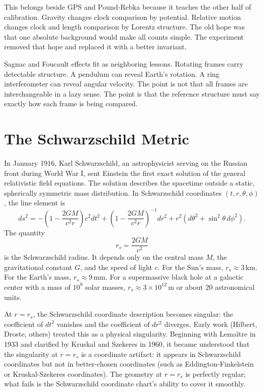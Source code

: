 This belongs beside GPS and Pound-Rebka because it teaches the other half of
calibration. Gravity changes clock comparison by potential. Relative motion
changes clock and length comparison by Lorentz structure. The old hope was that
one absolute background would make all counts simple. The experiment removed
that hope and replaced it with a better invariant.

Sagnac and Foucault effects fit as neighboring lessons. Rotating frames carry
detectable structure. A pendulum can reveal Earth's rotation. A ring
interferometer can reveal angular velocity. The point is not that all frames
are interchangeable in a lazy sense. The point is that the reference structure
must say exactly how each frame is being compared.

\section{The Schwarzschild Metric}
\label{se:the-schwarzschild-metric}

In January 1916, Karl Schwarzschild, an astrophysicist serving on the Russian
front during World War I, sent Einstein the first exact solution of the
general relativistic field equations. The solution describes the spacetime
outside a static, spherically symmetric mass distribution. In Schwarzschild
coordinates $(t, r, \theta, \phi)$, the line element is
\[
ds^2 = -\left(1 - \frac{2GM}{c^2 r}\right) c^2 dt^2 + \left(1 - \frac{2GM}{c^2 r}\right)^{-1} dr^2 + r^2(d\theta^2 + \sin^2\theta \, d\phi^2).
\]
The quantity
\[
r_s = \frac{2GM}{c^2}
\label{eq:chapter8-schwarzschild-radius}
\]
is the Schwarzschild radius. It depends only on the central mass $M$, the
gravitational constant $G$, and the speed of light $c$. For the Sun's mass,
$r_s \approx 3\,\mathrm{km}$. For the Earth's mass, $r_s \approx
9\,\mathrm{mm}$. For a supermassive black hole at a galactic center with a
mass of $10^9$ solar masses, $r_s \approx 3 \times 10^{12}\,\mathrm{m}$ or
about $20$ astronomical units.

At $r = r_s$, the Schwarzschild coordinate description becomes singular: the
coefficient of $dt^2$ vanishes and the coefficient of $dr^2$ diverges. Early
work (Hilbert, Droste, others) treated this as a physical singularity.
Beginning with Lema\^itre in 1933 and clarified by Kruskal and Szekeres in
1960, it became understood that the singularity at $r = r_s$ is a coordinate
artifact: it appears in Schwarzschild coordinates but not in better-chosen
coordinates (such as Eddington-Finkelstein or Kruskal-Szekeres coordinates).
The geometry at $r = r_s$ is perfectly regular; what fails is the
Schwarzschild coordinate chart's ability to cover it smoothly.

